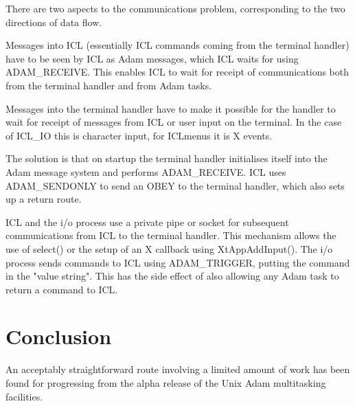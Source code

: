 There are two aspects to the communications problem, corresponding to
the two directions of data flow.

Messages into ICL (essentially ICL commands coming from the terminal
handler) have to be seen by ICL as Adam messages, which ICL waits for
using ADAM\_RECEIVE. This enables ICL to wait for receipt of
communications both from the terminal handler and from Adam tasks.

Messages into the terminal handler have to make it possible for the
handler to wait for receipt of messages from ICL or user input on the
terminal. In the case of ICL\_IO this is character input, for ICLmenus it
is X events.

The solution is that on startup the terminal handler initialises itself
into the Adam message system and performs ADAM\_RECEIVE. ICL uses
ADAM\_SENDONLY to send an OBEY to the terminal handler, which also sets
up a return route.

ICL and the i/o process use a private pipe or socket for subsequent
communications from ICL to the terminal handler. This mechanism allows
the use of select() or the setup of an X callback using XtAppAddInput().
The i/o process sends commands to ICL using ADAM\_TRIGGER, putting the
command in the "value string". This has the side effect of also allowing
any Adam task to return a command to ICL.

\section {Conclusion}

An acceptably straightforward route involving a limited amount of work
has been found for progressing from the alpha release of the Unix Adam
multitasking facilities.


                                                                                                                                                                                                                                                                                                                                                                                              
